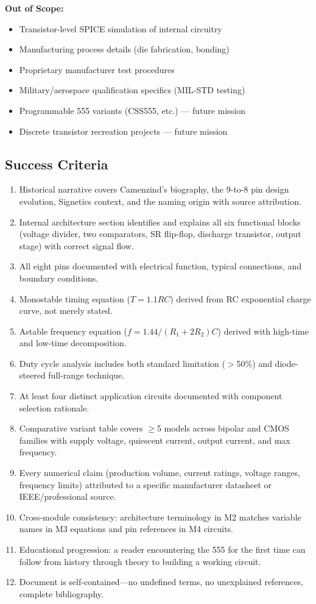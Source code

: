 \documentclass[11pt,letterpaper]{article}
\begin{document}
\textbf{Out of Scope:}
\begin{itemize}[leftmargin=2em]
  \item Transistor-level SPICE simulation of internal circuitry
  \item Manufacturing process details (die fabrication, bonding)
  \item Proprietary manufacturer test procedures
  \item Military/aerospace qualification specifics (MIL-STD testing)
  \item Programmable 555 variants (CSS555, etc.) --- future mission
  \item Discrete transistor recreation projects --- future mission
\end{itemize}

\subsection{Success Criteria}

\begin{enumerate}[leftmargin=2em]
  \item Historical narrative covers Camenzind's biography, the 9-to-8 pin design evolution, Signetics context, and the naming origin with source attribution.
  \item Internal architecture section identifies and explains all six functional blocks (voltage divider, two comparators, SR flip-flop, discharge transistor, output stage) with correct signal flow.
  \item All eight pins documented with electrical function, typical connections, and boundary conditions.
  \item Monostable timing equation ($T = 1.1RC$) derived from RC exponential charge curve, not merely stated.
  \item Astable frequency equation ($f = 1.44/(R_1+2R_2)C$) derived with high-time and low-time decomposition.
  \item Duty cycle analysis includes both standard limitation ($>$50\%) and diode-steered full-range technique.
  \item At least four distinct application circuits documented with component selection rationale.
  \item Comparative variant table covers $\geq$5 models across bipolar and CMOS families with supply voltage, quiescent current, output current, and max frequency.
  \item Every numerical claim (production volume, current ratings, voltage ranges, frequency limits) attributed to a specific manufacturer datasheet or IEEE/professional source.
  \item Cross-module consistency: architecture terminology in M2 matches variable names in M3 equations and pin references in M4 circuits.
  \item Educational progression: a reader encountering the 555 for the first time can follow from history through theory to building a working circuit.
  \item Document is self-contained---no undefined terms, no unexplained references, complete bibliography.
\end{enumerate}
\end{document}
